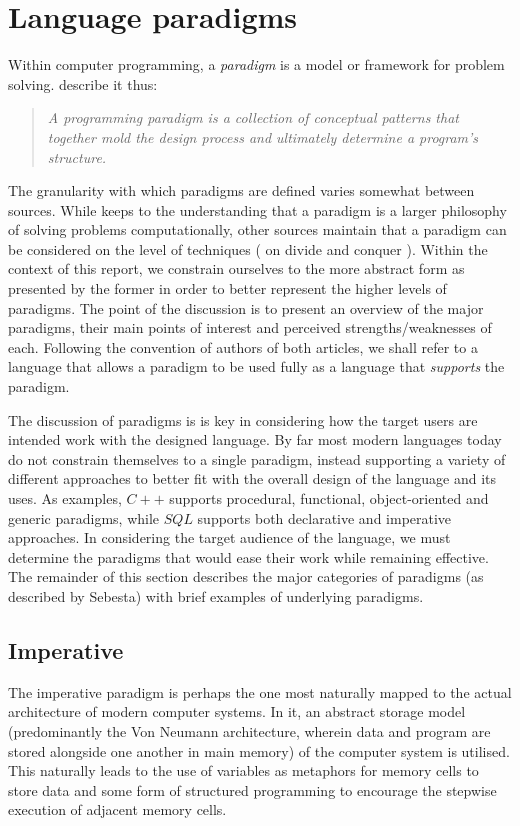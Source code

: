 \section{Language paradigms}
Within computer programming, a \emph{paradigm} is a model or framework for problem solving. \citeauthor{paradigms1992} describe it thus:

\begin{quote}
\emph{A programming paradigm is a collection of conceptual patterns that together mold the design process and ultimately determine a program's structure.}
\end{quote}

The granularity with which paradigms are defined varies somewhat between sources. While \citeauthor{paradigms1992} keeps to the understanding that a paradigm is a larger philosophy of solving problems computationally, other sources maintain that a paradigm can be considered on the level of techniques (\citeauthor{paradigms1978} on divide and conquer \cite{paradigms1978}). Within the context of this report, we constrain ourselves to the more abstract form as presented by the former in order to better represent the higher levels of paradigms. The point of the discussion is to present an overview of the major paradigms, their main points of interest and perceived strengths/weaknesses of each. Following the convention of authors of both articles, we shall refer to a language that allows a paradigm to be used fully as a language that \emph{supports} the paradigm.

The discussion of paradigms is is key in considering how the target users are intended work with the designed language. By far most modern languages today do not constrain themselves to a single paradigm, instead supporting a variety of different approaches to better fit with the overall design of the language and its uses. As examples, $C++$ supports procedural, functional, object-oriented and generic paradigms, while $SQL$ supports both declarative and imperative approaches. In considering the target audience of the language, we must determine the paradigms that would ease their work while remaining effective. The remainder of this section describes the major categories of paradigms (as described by Sebesta\cite{concepts_prog_lang}) with brief examples of underlying paradigms.

\subsection{Imperative}
The imperative paradigm is perhaps the one most naturally mapped to the actual architecture of modern computer systems. In it, an abstract storage model (predominantly the Von Neumann architecture, wherein data and program are stored alongside one another in main memory) of the computer system is utilised. This naturally leads to the use of variables as metaphors for memory cells to store data and some form of structured programming to encourage the stepwise execution of adjacent memory cells.

